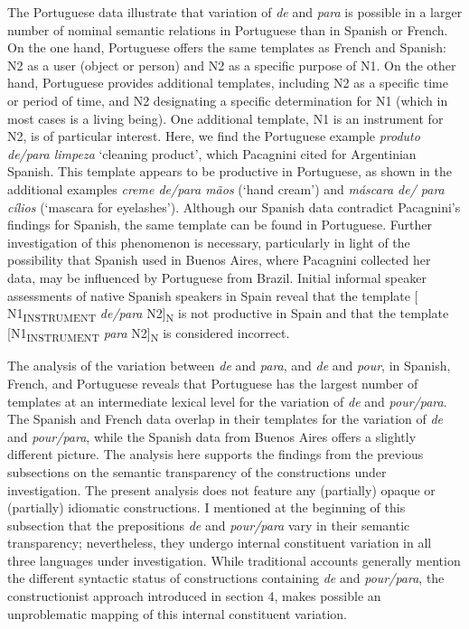 \documentclass[output=paper]{langsci/langscibook}
\begin{document}
The Portuguese data illustrate that variation of \textit{de} and \textit{para} is possible in a larger number of nominal semantic relations in Portuguese than in Spanish or French. On the one hand, Portuguese offers the same templates as French and Spanish: N2 as a user (object or person) and N2 as a specific purpose of N1. On the other hand, Portuguese provides additional templates, including N2 as a specific time or period of time, and N2 designating a specific determination for N1 (which in most cases is a living being). One additional template, N1 is an instrument for N2, is of particular interest. Here, we find the Portuguese example \textit{produto de/para limpeza} `cleaning product', which Pacagnini cited for Argentinian Spanish. This template appears to be productive in Portuguese, as shown in the additional examples \textit{creme de/para mãos} (`hand cream') and \textit{máscara de/ para cílios} (`mascara for eyelashes'). Although our Spanish data contradict Pacagnini's findings for Spanish, the same template can be found in Portuguese. Further investigation of this phenomenon is necessary, particularly in light of the possibility that Spanish used in Buenos Aires, where Pacagnini collected her data, may be influenced by Portuguese from Brazil. Initial informal speaker assessments of native Spanish speakers in Spain reveal that the template [ N1\textsubscript{INSTRUMENT} \textit{de/para} N2]\textsubscript{N} is not productive in Spain and that the template [N1\textsubscript{INSTRUMENT} \textit{para} N2]\textsubscript{N} is considered incorrect. 

The analysis of the variation between \textit{de} and \textit{para}, and \textit{de} and \textit{pour}, in Spanish, French, and Portuguese reveals that Portuguese has the largest number of templates at an intermediate lexical level for the variation of \textit{de} and \textit{pour/para}. The Spanish and French data overlap in their templates for the variation of \textit{de} and \textit{pour/para}, while the Spanish data from Buenos Aires \citep{Pacagnini:2003} offers a slightly different picture. The analysis here supports the findings from the previous subsections on the semantic transparency of the constructions under investigation. The present analysis does not feature any (partially) opaque or (partially) idiomatic constructions.
I mentioned at the beginning of this subsection that the prepositions \textit{de} and \textit{pour/para} vary in their semantic transparency; nevertheless, they undergo internal constituent variation in all three languages under investigation. While traditional accounts generally mention the different syntactic status of constructions containing \textit{de} and \textit{pour/para}, the constructionist approach introduced in section 4, makes possible an unproblematic mapping of this internal constituent variation.  
\end{document}
